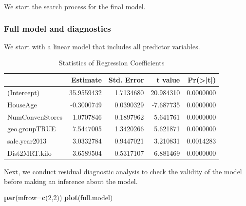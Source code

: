 \documentclass[
]{book}
\newenvironment{Shaded}{\begin{snugshade}}{\end{snugshade}}
\newcommand{\AttributeTok}[1]{\textcolor[rgb]{0.13,0.29,0.53}{#1}}
\newcommand{\DecValTok}[1]{\textcolor[rgb]{0.00,0.00,0.81}{#1}}
\newcommand{\FunctionTok}[1]{\textcolor[rgb]{0.13,0.29,0.53}{\textbf{#1}}}
\newcommand{\NormalTok}[1]{#1}
\newcommand{\OtherTok}[1]{\textcolor[rgb]{0.56,0.35,0.01}{#1}}
\newcommand{\SpecialCharTok}[1]{\textcolor[rgb]{0.81,0.36,0.00}{\textbf{#1}}}
\newcommand{\StringTok}[1]{\textcolor[rgb]{0.31,0.60,0.02}{#1}}
\begin{document}
We start the search process for the final model.

\hypertarget{full-model-and-diagnostics}{%
\subsubsection{Full model and diagnostics}\label{full-model-and-diagnostics}}

We start with a linear model that includes all predictor variables.

\begin{Shaded}
\end{Shaded}

\begin{table}

\caption{\label{tab:unnamed-chunk-81}Statistics of Regression Coefficients}
\centering
\begin{tabular}[t]{l|r|r|r|r}
\hline
  & Estimate & Std. Error & t value & Pr(>|t|)\\
\hline
(Intercept) & 35.9559432 & 1.7134680 & 20.984310 & 0.0000000\\
\hline
HouseAge & -0.3000749 & 0.0390329 & -7.687735 & 0.0000000\\
\hline
NumConvenStores & 1.0707846 & 0.1897962 & 5.641761 & 0.0000000\\
\hline
geo.groupTRUE & 7.5447005 & 1.3420266 & 5.621871 & 0.0000000\\
\hline
sale.year2013 & 3.0332784 & 0.9447021 & 3.210831 & 0.0014283\\
\hline
Dist2MRT.kilo & -3.6589504 & 0.5317107 & -6.881469 & 0.0000000\\
\hline
\end{tabular}
\end{table}

Next, we conduct residual diagnostic analysis to check the validity of the model before making an inference about the model.

\begin{Shaded}
\begin{Highlighting}[]
\FunctionTok{par}\NormalTok{(}\AttributeTok{mfrow=}\FunctionTok{c}\NormalTok{(}\DecValTok{2}\NormalTok{,}\DecValTok{2}\NormalTok{))}
\FunctionTok{plot}\NormalTok{(full.model)}
\end{Highlighting}
\end{Shaded}
\end{document}
